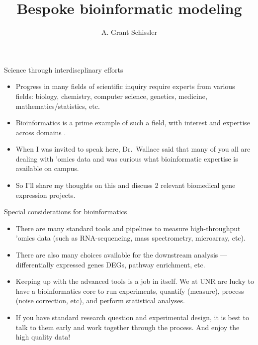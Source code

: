 \documentclass[ignorenonframetext,aspectratio=169,]{beamer}
\title{Bespoke bioinformatic modeling}
\author{A. Grant Schissler}
\institute{Department of Mathematics and Statistics University of Nevada, Reno}
\date{}
\providecommand{\tightlist}{%
  \setlength{\itemsep}{0pt}\setlength{\parskip}{0pt}}
\begin{document}
\frame{\titlepage}

\begin{frame}{%
\protect\hypertarget{science-through-interdiscplinary-efforts}{%
Science through interdiscplinary efforts}}

\begin{itemize}
\tightlist
\item
  Progress in many fields of scientific inquiry require experts from
  various fields: biology, chemistry, computer science, genetics,
  medicine, mathematics/statistics, etc.
\item
  Bioinformatics is a prime example of such a field, with interest and
  expertise across domains .
\item
  When I was invited to speak here, Dr.~Wallace said that many of you
  all are dealing with ’omics data and was curious what bioinformatic
  expertise is available on campus.
\item
  So I’ll share my thoughts on this and discuss 2 relevant biomedical
  gene expression projects.
\end{itemize}

\end{frame}

\begin{frame}{%
\protect\hypertarget{special-considerations-for-bioinformatics}{%
Special considerations for bioinformatics}}

\begin{itemize}
\tightlist
\item
  There are many standard tools and pipelines to measure high-throughput
  ’omics data (such as RNA-sequencing, mass spectrometry, microarray,
  etc).
\item
  There are also many choices available for the downstream analysis —
  differentially expressed genes DEGs, pathway enrichment, etc.
\item
  Keeping up with the advanced tools is a job in itself. We at UNR are
  lucky to have a bioinformatics core to run experiments, quantify
  (measure), process (noise correction, etc), and perform statistical
  analyses.
\item
  If you have standard research question and experimental design, it is
  best to talk to them early and work together through the process. And
  enjoy the high quality data!
\end{itemize}

\end{frame}
\end{document}
